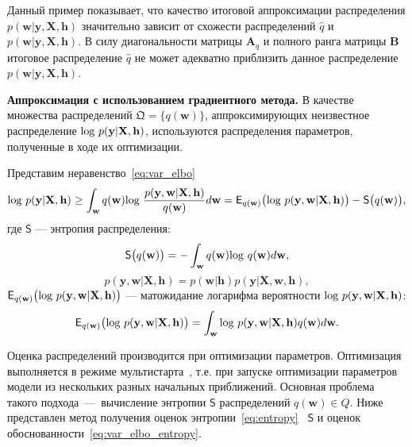 \begin{example}
{Данный пример показывает, что качество итоговой аппроксимации распределения $p(\mathbf{w}|\mathbf{y}, \mathbf{X}, \mathbf{h})$ значительно зависит от схожести распределений $\hat{q}$ и $p(\mathbf{w}|\mathbf{y}, \mathbf{X}, \mathbf{h})$. В силу диагональности матрицы $\mathbf{A}_q$ и полного ранга матрицы $\mathbf{B}$  итоговое распределение $\hat{q}$ не может адекватно приблизить данное распределение  $p(\mathbf{w}|\mathbf{y}, \mathbf{X}, \mathbf{h})$.}

\end{example}

\textbf{Аппроксимация с использованием градиентного метода. }
В качестве множества распределений $\mathfrak{Q} = \{q(\mathbf{w})\}$, аппроксимирующих неизвестное распределение $\textnormal{log}~p(\mathbf{y}|\mathbf{X},\mathbf{h})$, используются распределения параметров, полученные в ходе их оптимизации.

Представим неравенство~\eqref{eq:var_elbo}
\begin{equation}
\label{eq:var_elbo_entropy}
 \textnormal{log}~p(\mathbf{y}|\mathbf{X},\mathbf{h}) \geq \int_\mathbf{w} q(\mathbf{w})\textnormal{log}~\frac{p(\mathbf{y},\mathbf{w}|\mathbf{X}, \mathbf{h})}{q(\mathbf{w})}d\mathbf{w} =  \mathsf{E}_{q(\mathbf{w)}}\bigl(\textnormal{log~}p (\mathbf{y}, \mathbf{w}|\mathbf{X}, \mathbf{h})\bigr) - \mathsf{S}\bigl({q(\mathbf{w)}}\bigr),
\end{equation}
где $\mathsf{S}$ --- энтропия распределения:
\[
\mathsf{S}\bigl({q(\mathbf{w)}}\bigr) = - \int_{\mathbf{w}} q(\mathbf{w})\textnormal{log}~q(\mathbf{w})d\mathbf{w},
\]
$$p (\mathbf{y}, \mathbf{w}|\mathbf{X}, \mathbf{h}) = p (\mathbf{w}| \mathbf{h}) p (\mathbf{y}|\mathbf{X}, \mathbf{w}, \mathbf{h}),$$
$\mathsf{E}_{q(\mathbf{w)}}\bigl(\textnormal{log~}p (\mathbf{y}, \mathbf{w}|\mathbf{X}, \mathbf{h})\bigr)$ --- матожидание логарифма вероятности $\textnormal{log~}p (\mathbf{y}, \mathbf{w}|\mathbf{X}, \mathbf{h})$:
\[
	\mathsf{E}_{q(\mathbf{w)}}\bigl(\textnormal{log~}p (\mathbf{y}, \mathbf{w}|\mathbf{X}, \mathbf{h})\bigr) = \int_\mathbf{w} \textnormal{log~}p (\mathbf{y}, \mathbf{w}|\mathbf{X}, \mathbf{h}) q(\mathbf{w}) d\mathbf{w}.
\]

Оценка распределений производится при оптимизации параметров. Оптимизация выполняется в режиме мультистарта~\cite{multi}, т.е. при запуске оптимизации параметров модели из нескольких разных начальных приближений. Основная проблема такого подхода~---~вычисление энтропии $\mathsf{S}$ распределений $q(\mathbf{w}) \in Q$. Ниже представлен метод получения оценок энтропии~\eqref{eq:entropy} ~$\mathsf{S}$ и оценок обоснованности~\eqref{eq:var_elbo_entropy}.


